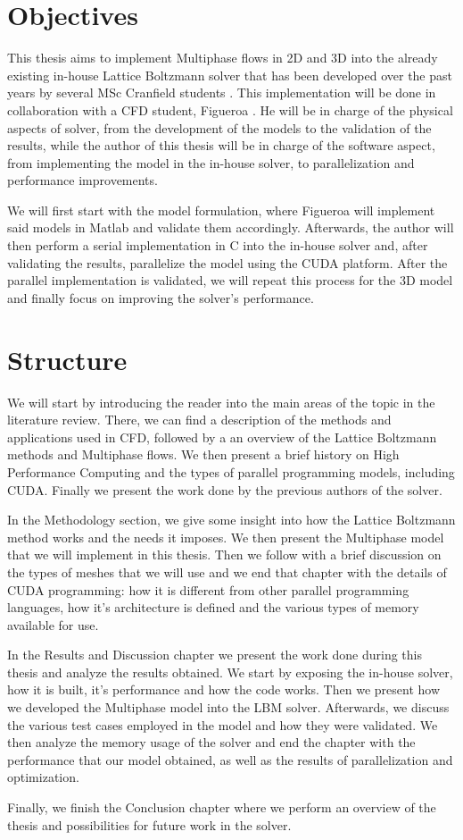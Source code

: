 \documentclass[12pt, openany]{book}
\begin{document}
\section{Objectives}
This thesis aims to implement Multiphase flows in 2D and 3D into the already existing in-house Lattice Boltzmann solver that has been developed over the past years by several MSc Cranfield students  \cite{maciej_thesis,koleszar_thesis,jozsa_thesis,szoke_thesis}. This implementation will be done in collaboration with a CFD student, Figueroa \cite{antonioThesis}. He will be in charge of the physical aspects of solver, from the development of the models to the validation of the results, while the author of this thesis will be in charge of the software aspect, from implementing the model in the in-house solver, to parallelization and performance improvements. \par
We will first start with the model formulation, where Figueroa will implement said models in Matlab and validate them accordingly. Afterwards, the author will then perform a serial implementation in C into the in-house solver and, after validating the results, parallelize the model using the CUDA platform. After the parallel implementation is validated, we will repeat this process for the 3D model and finally focus on improving the solver's performance. 
\section{Structure}
We will start by introducing the reader into the main areas of the topic in the literature review. There, we can find a description of the methods and applications used in CFD, followed by a an overview of the Lattice Boltzmann methods and Multiphase flows. We then present a brief history on High Performance Computing and the types of parallel programming models, including CUDA. Finally we present the work done by the previous authors of the solver.\par
In the Methodology section, we give some insight into how the Lattice Boltzmann method works and the needs it imposes. We then present the Multiphase model that we will implement in this thesis. Then we follow with a brief discussion on the types of meshes that we will use and we end that chapter with the details of CUDA programming: how it is different from other parallel programming languages, how it's architecture is defined and the various types of memory available for use.\par
In the Results and Discussion chapter we present the work done during this thesis and analyze the results obtained. We start by exposing the in-house solver, how it is built, it's performance and how the code works. Then we present how we developed the Multiphase model into the LBM solver. Afterwards, we discuss the various test cases employed in the model and how they were validated. We then analyze the memory usage of the solver and end the chapter with the performance that our model obtained, as well as the results of parallelization and optimization.\par
Finally, we finish the Conclusion chapter where we perform an overview of the thesis and possibilities for future work in the solver.
\end{document}
